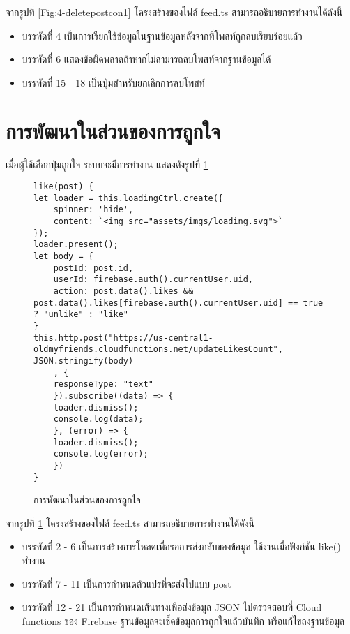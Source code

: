 	จากรูปที่ \ref{Fig:4-deletepostcon1} โครงสร้างของไฟล์ feed.ts สามารถอธิบายการทำงานได้ดังนี้
	\begin{itemize}[label={--}]
	\item บรรทัดที่ 4 เป็นการเรียกใช้ข้อมูลในฐานข้อมูลหลังจากที่โพสท์ถูกลบเรียบร้อยแล้ว
	\item บรรทัดที่ 6 แสดงข้อผิดพลาดถ้าหากไม่สามารถลบโพสท์จากฐานข้อมูลได้
	\item บรรทัดที่ 15 - 18 เป็นปุ่มสำหรับยกเลิกการลบโพสท์
	\end{itemize}
	\newpage
	


\section{การพัฒนาในส่วนของการถูกใจ}
เมื่อผู้ใช้เลือกปุ่มถูกใจ ระบบจะมีการทำงาน แสดงดังรูปที่ \ref{Fig:4-likepost}

\begin{figure}[H]
{\lstset{language=Pascal}
\begin{lstlisting}
like(post) {
let loader = this.loadingCtrl.create({
	spinner: 'hide',
	content: `<img src="assets/imgs/loading.svg">`
});
loader.present();
let body = {
	postId: post.id,
	userId: firebase.auth().currentUser.uid,
	action: post.data().likes && post.data().likes[firebase.auth().currentUser.uid] == true ? "unlike" : "like"
}
this.http.post("https://us-central1-oldmyfriends.cloudfunctions.net/updateLikesCount", JSON.stringify(body)
	, {
	responseType: "text"
	}).subscribe((data) => {
	loader.dismiss();
	console.log(data);
	}, (error) => {
	loader.dismiss();
	console.log(error);
	})
}
\end{lstlisting}}
\caption{การพัฒนาในส่วนของการถูกใจ}
\label{Fig:4-likepost}
\end{figure}

จากรูปที่ \ref{Fig:4-likepost} โครงสร้างของไฟล์ feed.ts สามารถอธิบายการทำงานได้ดังนี้
\begin{itemize}[label={--}]
\item บรรทัดที่ 2 - 6 เป็นการสร้างการโหลดเพื่อรอการส่งกลับของข้อมูล ใช้งานเมื่อฟังก์ชัน like() ทำงาน
\item บรรทัดที่ 7 - 11 เป็นการกำหนดตัวแปรที่จะส่งไปแบบ post
\item บรรทัดที่ 12 - 21 เป็นการกำหนดเส้นทางเพือส่งข้อมูล JSON ไปตรวจสอบที่ Cloud functions ของ Firebase ฐานข้อมูลจะเช็คข้อมูลการถูกใจแล้วบันทึก หรือแก้ไขลงฐานข้อมูล
\end{itemize}
\newpage


